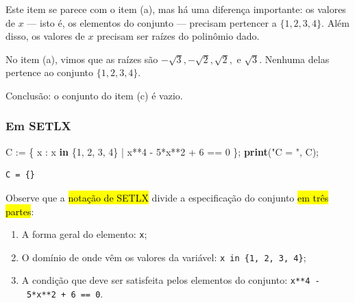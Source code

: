 \documentclass[
  letterpaper,
  DIV=11,
  numbers=noendperiod]{scrreprt}
\newenvironment{Shaded}{\begin{snugshade}}{\end{snugshade}}
\newcommand{\DecValTok}[1]{\textcolor[rgb]{0.00,0.00,0.81}{#1}}
\newcommand{\KeywordTok}[1]{\textcolor[rgb]{0.13,0.29,0.53}{\textbf{#1}}}
\newcommand{\NormalTok}[1]{#1}
\newcommand{\StringTok}[1]{\textcolor[rgb]{0.31,0.60,0.02}{#1}}
\providecommand{\tightlist}{%
  \setlength{\itemsep}{0pt}\setlength{\parskip}{0pt}}\usepackage{longtable,booktabs,array}
\begin{document}
\begin{tcolorbox}[enhanced jigsaw, breakable, toptitle=1mm, opacitybacktitle=0.6, colback=white, toprule=.15mm, left=2mm, rightrule=.15mm, leftrule=.75mm, title={Resposta (c)}, coltitle=black, arc=.35mm, bottomtitle=1mm, opacityback=0, bottomrule=.15mm, colframe=quarto-callout-important-color-frame, titlerule=0mm, colbacktitle=quarto-callout-important-color!10!white]

Este item se parece com o item (a), mas há uma diferença importante: os
valores de $x$ --- isto é, os elementos do conjunto --- precisam
pertencer a $\{ 1, 2, 3, 4 \}$. Além disso, os valores de $x$ precisam
ser raízes do polinômio dado.

No item (a), vimos que as raízes são
$-\sqrt3, -\sqrt2, \sqrt2, \text{ e } \sqrt3$. Nenhuma delas pertence ao
conjunto $\{ 1, 2, 3, 4 \}$.

Conclusão: o conjunto do item (c) é vazio.

\subsubsection*{Em SETLX}\label{em-setlx-1}

\begin{Shaded}
\begin{Highlighting}[]
\NormalTok{C := \{ x : x }\KeywordTok{in}\NormalTok{ \{}\DecValTok{1}\NormalTok{, }\DecValTok{2}\NormalTok{, }\DecValTok{3}\NormalTok{, }\DecValTok{4}\NormalTok{\} | x**}\DecValTok{4}\NormalTok{ {-} }\DecValTok{5}\NormalTok{*x**}\DecValTok{2}\NormalTok{ + }\DecValTok{6}\NormalTok{ == }\DecValTok{0}\NormalTok{ \};}
\KeywordTok{print}\NormalTok{(}\StringTok{"C = "}\NormalTok{, C);}
\end{Highlighting}
\end{Shaded}

\begin{verbatim}
C = {}
\end{verbatim}

Observe que a {\hl{notação de SETLX}} divide a especificação do conjunto
{\hl{em três partes}}:

\begin{enumerate}
\def\labelenumi{\arabic{enumi}.}
\tightlist
\item
  A forma geral do elemento: \texttt{x};
\item
  O domínio de onde vêm os valores da variável:
  \texttt{x\ in\ \{1,\ 2,\ 3,\ 4\}};
\item
  A condição que deve ser satisfeita pelos elementos do conjunto:
  \texttt{x**4\ -\ 5*x**2\ +\ 6\ ==\ 0}.
\end{enumerate}


\end{tcolorbox}
\end{document}
